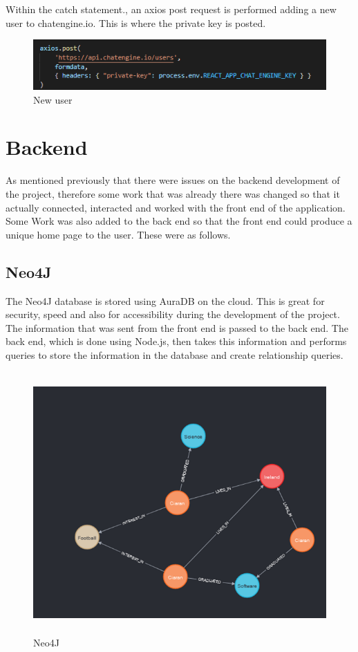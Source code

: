 Within the catch statement., an axios post request is performed adding a new user to chatengine.io. This is where the private key is posted. 
\begin{figure}[H]
    \centering
    \includegraphics{img/messenger4.png}
    \caption{New user} 
    \label{fig:my_label}
\end{figure}

\section{Backend}

As mentioned previously that there were issues on the backend development of the project, therefore some work that was already there was changed so that it actually connected, interacted and worked with the front end of the application. Some Work was also added to the back end so that the front end could produce a unique home page to the user. These were as follows.

\subsection{Neo4J}
The Neo4J database is stored using AuraDB on the cloud. This is great for security, speed and also for accessibility during the development of the project. The information that was sent from the front end is passed to the back end. The back end, which is done using Node.js, then takes this information and performs queries to store the information in the database and create relationship queries. 
\begin{figure}[H]
    \centering
    \includegraphics[height=10cm]{img/Backend1.png}
    \caption{Neo4J} 
    \label{fig:my_label}
\end{figure}

